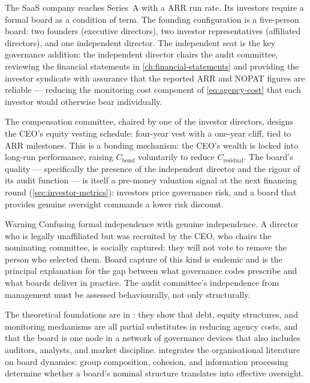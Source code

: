 \begin{example}
The SaaS company reaches Series~A with a  ARR run rate. Its investors require
a formal board as a condition of term. The founding configuration is a five-person board: two
founders (executive directors), two investor representatives (affiliated directors), and one
independent director. The independent seat is the key governance addition: the independent
director chairs the audit committee, reviewing the financial statements in \cref{ch:financial-statements}
and providing the investor syndicate with assurance that the reported ARR and NOPAT figures are
reliable --- reducing the monitoring cost component of \cref{eq:agency-cost} that each investor
would otherwise bear individually.

The compensation committee, chaired by one of the investor directors, designs the CEO's equity
vesting schedule: four-year vest with a one-year cliff, tied to ARR milestones. This is a
bonding mechanism: the CEO's wealth is locked into long-run performance, raising \(C_{\text{bond}}\)
voluntarily to reduce \(C_{\text{residual}}\). The board's quality --- specifically the presence
of the independent director and the rigour of its audit function --- is itself a pre-money
valuation signal at the next financing round (\cref{sec:investor-metrics}): investors price
governance risk, and a board that provides genuine oversight commands a lower risk discount.
\end{example}

\begin{admonition}{Warning}
Confusing formal independence with genuine independence. A director who is legally unaffiliated
but was recruited by the CEO, who chairs the nominating committee, is socially captured: they
will not vote to remove the person who selected them. Board capture of this kind is endemic and
is the principal explanation for the gap between what governance codes prescribe and what boards
deliver in practice. The audit committee's independence from management must be assessed
behaviourally, not only structurally.
\end{admonition}

The theoretical foundations are in \textcite{jensen1976agency}: they show that debt, equity
structures, and monitoring mechanisms are all partial substitutes in reducing agency costs, and
that the board is one node in a network of governance devices that also includes auditors,
analysts, and market discipline. \textcite{robbins2022} integrates the organisational literature
on board dynamics: group composition, cohesion, and information processing determine whether a
board's nominal structure translates into effective oversight.

